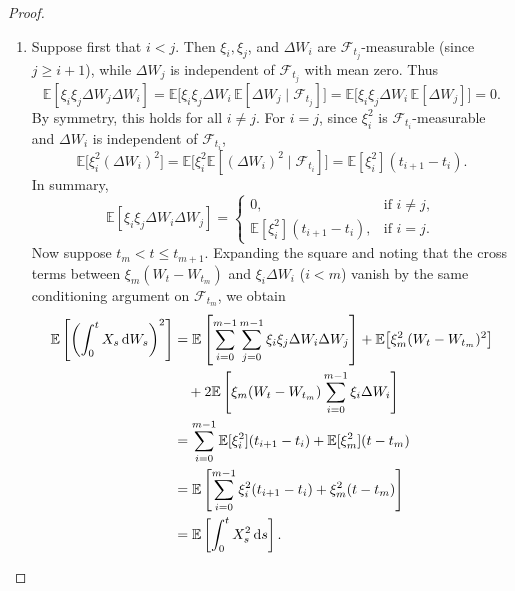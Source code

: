 \begin{proof}
\begin{enumerate}
    \item Suppose first that $i < j$. Then $\xi_i, \xi_j$, and $\Delta W_i$ are $\mathcal{F}_{t_j}$-measurable (since $j \ge i+1$), while $\Delta W_j$ is independent of $\mathcal{F}_{t_j}$ with mean zero. Thus
    \[
    \mathbb{E}[\xi_i \xi_j \Delta W_j \Delta W_i] = \mathbb{E}\big[\xi_i \xi_j \Delta W_i \, \mathbb{E}[\Delta W_j \mid \mathcal{F}_{t_j}]\big] = \mathbb{E}\big[\xi_i \xi_j \Delta W_i \, \mathbb{E}[\Delta W_j]\big] = 0.
    \]
    By symmetry, this holds for all $i \neq j$. For $i = j$, since $\xi_i^2$ is $\mathcal{F}_{t_i}$-measurable and $\Delta W_i$ is independent of $\mathcal{F}_{t_i}$,
    \[
    \mathbb{E}\big[\xi_i^2 (\Delta W_i)^2\big] = \mathbb{E}\big[\xi_i^2 \mathbb{E}[(\Delta W_i)^2 \mid \mathcal{F}_{t_i}]\big] = \mathbb{E}[\xi_i^2](t_{i+1} - t_i).
    \]
    In summary,
    \[
    \mathbb{E}[\xi_i \xi_j \Delta W_i \Delta W_j] =
    \begin{cases}
        0, & \text{if } i \neq j, \\
        \mathbb{E}[\xi_i^2](t_{i+1} - t_i), & \text{if } i = j.
    \end{cases}
    \]
    Now suppose $t_m < t \le t_{m+1}$. Expanding the square and noting that the cross terms between $\xi_m(W_t - W_{t_m})$ and $\xi_i \Delta W_i$ ($i < m$) vanish by the same conditioning argument on $\mathcal{F}_{t_m}$, we obtain
    \begin{align*}
    \mathbb{E}\left[\left(\int_0^t X_s \,\mathrm{d} W_s\right)^2\right]
    &= \mathbb{E}\left[\sum_{i=0}^{m-1} \sum_{j=0}^{m-1} \xi_i \xi_j \Delta W_i \Delta W_j\right] + \mathbb{E}\big[\xi_m^2(W_t - W_{t_m})^2\big] \\
    &\quad + 2\mathbb{E}\left[\xi_m(W_t - W_{t_m}) \sum_{i=0}^{m-1} \xi_i \Delta W_i\right] \\
    &= \sum_{i=0}^{m-1} \mathbb{E}[\xi_i^2](t_{i+1} - t_i) + \mathbb{E}[\xi_m^2](t - t_m) \\
    &= \mathbb{E}\left[\sum_{i=0}^{m-1} \xi_i^2 (t_{i+1} - t_i) + \xi_m^2 (t - t_m)\right] \\
    &= \mathbb{E}\left[\int_0^t X_s^2 \,\mathrm{d} s\right]. \qedhere
    \end{align*}
\end{enumerate}
\end{proof}

